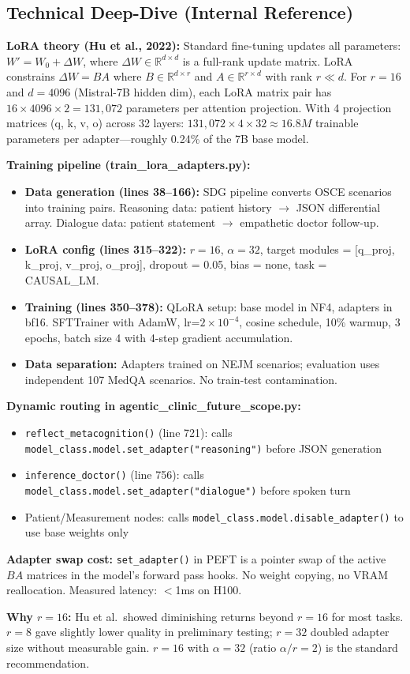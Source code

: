 \subsection*{Technical Deep-Dive (Internal Reference)}
{\color{techgray}
\textbf{LoRA theory (Hu et al., 2022):} Standard fine-tuning updates all parameters: $W' = W_0 + \Delta W$, where $\Delta W \in \mathbb{R}^{d \times d}$ is a full-rank update matrix. LoRA constrains $\Delta W = BA$ where $B \in \mathbb{R}^{d \times r}$ and $A \in \mathbb{R}^{r \times d}$ with rank $r \ll d$. For $r=16$ and $d=4096$ (Mistral-7B hidden dim), each LoRA matrix pair has $16 \times 4096 \times 2 = 131,072$ parameters per attention projection. With 4 projection matrices (q, k, v, o) across 32 layers: $131,072 \times 4 \times 32 \approx 16.8M$ trainable parameters per adapter---roughly 0.24\% of the 7B base model.

\textbf{Training pipeline (train\_lora\_adapters.py):}
\begin{itemize}
  \item \textbf{Data generation (lines 38--166):} SDG pipeline converts OSCE scenarios into training pairs. Reasoning data: patient history $\to$ JSON differential array. Dialogue data: patient statement $\to$ empathetic doctor follow-up.
  \item \textbf{LoRA config (lines 315--322):} $r=16$, $\alpha=32$, target modules = [q\_proj, k\_proj, v\_proj, o\_proj], dropout = 0.05, bias = none, task = CAUSAL\_LM.
  \item \textbf{Training (lines 350--378):} QLoRA setup: base model in NF4, adapters in bf16. SFTTrainer with AdamW, lr=$2 \times 10^{-4}$, cosine schedule, 10\% warmup, 3 epochs, batch size 4 with 4-step gradient accumulation.
  \item \textbf{Data separation:} Adapters trained on NEJM scenarios; evaluation uses independent 107 MedQA scenarios. No train-test contamination.
\end{itemize}

\textbf{Dynamic routing in agentic\_clinic\_future\_scope.py:}
\begin{itemize}
  \item \texttt{reflect\_metacognition()} (line 721): calls \texttt{model\_class.model.set\_adapter("reasoning")} before JSON generation
  \item \texttt{inference\_doctor()} (line 756): calls \texttt{model\_class.model.set\_adapter("dialogue")} before spoken turn
  \item Patient/Measurement nodes: calls \texttt{model\_class.model.disable\_adapter()} to use base weights only
\end{itemize}

\textbf{Adapter swap cost:} \texttt{set\_adapter()} in PEFT is a pointer swap of the active $BA$ matrices in the model's forward pass hooks. No weight copying, no VRAM reallocation. Measured latency: $<$1ms on H100.

\textbf{Why $r=16$:} Hu et al.\ showed diminishing returns beyond $r=16$ for most tasks. $r=8$ gave slightly lower quality in preliminary testing; $r=32$ doubled adapter size without measurable gain. $r=16$ with $\alpha=32$ (ratio $\alpha/r = 2$) is the standard recommendation.
}

